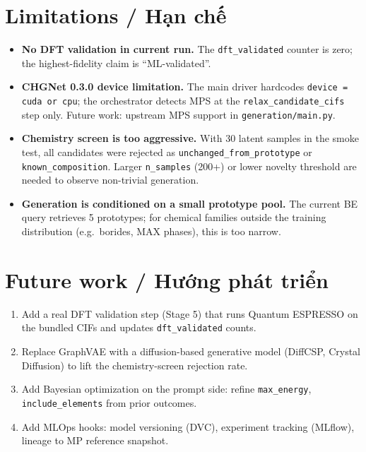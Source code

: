 \documentclass[11pt,a4paper]{report}
\begin{document}
\section{Limitations / Hạn chế}

\begin{itemize}[leftmargin=*,itemsep=2pt]
\item \textbf{No DFT validation in current run.} The \texttt{dft\_validated} counter is
      zero; the highest-fidelity claim is ``ML-validated''.
\item \textbf{CHGNet 0.3.0 device limitation.} The main driver hardcodes \texttt{device =
      cuda or cpu}; the orchestrator detects MPS at the \texttt{relax\_candidate\_cifs}
      step only. Future work: upstream MPS support in \texttt{generation/main.py}.
\item \textbf{Chemistry screen is too aggressive.} With 30 latent samples in the smoke
      test, all candidates were rejected as \texttt{unchanged\_from\_prototype} or
      \texttt{known\_composition}. Larger \texttt{n\_samples} (200+) or lower novelty
      threshold are needed to observe non-trivial generation.
\item \textbf{Generation is conditioned on a small prototype pool.} The current BE query
      retrieves 5 prototypes; for chemical families outside the training distribution
      (e.g.\ borides, MAX phases), this is too narrow.
\end{itemize}

\section{Future work / Hướng phát triển}

\begin{enumerate}[leftmargin=*,itemsep=2pt]
\item Add a real DFT validation step (Stage 5) that runs Quantum ESPRESSO on the bundled
      CIFs and updates \texttt{dft\_validated} counts.
\item Replace GraphVAE with a diffusion-based generative model (DiffCSP, Crystal Diffusion)
      to lift the chemistry-screen rejection rate.
\item Add Bayesian optimization on the prompt side: refine \texttt{max\_energy},
      \texttt{include\_elements} from prior outcomes.
\item Add MLOps hooks: model versioning (DVC), experiment tracking (MLflow), lineage to MP
      reference snapshot.
\end{enumerate}
\end{document}
